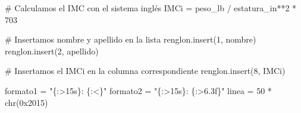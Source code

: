 \documentclass[
  spanish,
  letterpaper,
]{scrbook}
\newenvironment{Shaded}{\begin{snugshade}}{\end{snugshade}}
\newcommand{\BaseNTok}[1]{\textcolor[rgb]{0.68,0.00,0.00}{#1}}
\newcommand{\BuiltInTok}[1]{\textcolor[rgb]{0.00,0.23,0.31}{#1}}
\newcommand{\CommentTok}[1]{\textcolor[rgb]{0.37,0.37,0.37}{#1}}
\newcommand{\DecValTok}[1]{\textcolor[rgb]{0.68,0.00,0.00}{#1}}
\newcommand{\NormalTok}[1]{\textcolor[rgb]{0.00,0.23,0.31}{#1}}
\newcommand{\OperatorTok}[1]{\textcolor[rgb]{0.37,0.37,0.37}{#1}}
\newcommand{\SpecialCharTok}[1]{\textcolor[rgb]{0.37,0.37,0.37}{#1}}
\newcommand{\StringTok}[1]{\textcolor[rgb]{0.13,0.47,0.30}{#1}}
\theoremstyle{definition}
\theoremstyle{remark}
\begin{document}
\begin{Shaded}
\begin{Highlighting}[]
\CommentTok{\# Calculamos el IMC con el sistema inglés}
\NormalTok{IMCi }\OperatorTok{=}\NormalTok{ peso\_lb }\OperatorTok{/}\NormalTok{ estatura\_in}\OperatorTok{**}\DecValTok{2} \OperatorTok{*} \DecValTok{703}

\CommentTok{\# Insertamos nombre y apellido en la lista}
\NormalTok{renglon.insert(}\DecValTok{1}\NormalTok{, nombre)}
\NormalTok{renglon.insert(}\DecValTok{2}\NormalTok{, apellido)}

\CommentTok{\# Insertamos el IMCi en la columna correspondiente}
\NormalTok{renglon.insert(}\DecValTok{8}\NormalTok{, IMCi)}

\NormalTok{formato1 }\OperatorTok{=} \StringTok{"}\SpecialCharTok{\{:\textgreater{}15s\}}\StringTok{: }\SpecialCharTok{\{:\textless{}\}}\StringTok{"}
\NormalTok{formato2 }\OperatorTok{=} \StringTok{"}\SpecialCharTok{\{:\textgreater{}15s\}}\StringTok{: }\SpecialCharTok{\{:\textgreater{}6.3f\}}\StringTok{"}
\NormalTok{linea }\OperatorTok{=} \DecValTok{50} \OperatorTok{*} \BuiltInTok{chr}\NormalTok{(}\BaseNTok{0x2015}\NormalTok{)}


\end{Highlighting}
\end{Shaded}
\end{document}
